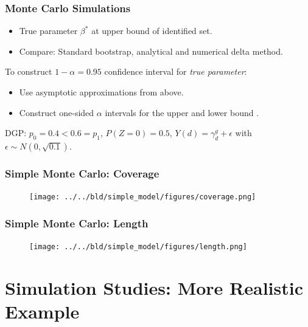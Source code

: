 \documentclass[11pt, aspectratio=169]{beamer}
\begin{document}
\begin{frame}
    \frametitle{Monte Carlo Simulations}

    \begin{itemize}
        \item True parameter $\beta^*$ at upper bound of identified set.
        \item Compare: Standard bootstrap, analytical and numerical delta method.
    \end{itemize}

    \vspace{0.5cm}

    To construct $1-\alpha = 0.95$ confidence interval for \textit{true parameter}:
    \begin{itemize}
        \item Use asymptotic approximations from above.
        \item Construct one-sided $\alpha$ intervals for the upper and lower bound \citep{imbens2004confidence}.
    \end{itemize}

    \vspace{0.5cm}

    DGP\@: $p_0 = 0.4 < 0.6 = p_1$, $P(Z=0)=0.5$, $Y(d) = \gamma_d^g + \epsilon$ with $\epsilon\sim N(0, \sqrt{0.1})$.


\end{frame}

\begin{frame}
    \frametitle{Simple Monte Carlo: Coverage}

    \begin{figure}
        \texttt{[image: ../../bld/simple\_model/figures/coverage.png]}
    \end{figure}

\end{frame}

\begin{frame}
    \frametitle{Simple Monte Carlo: Length}

    \begin{figure}
        \texttt{[image: ../../bld/simple\_model/figures/length.png]}
    \end{figure}

\end{frame}

\section{Simulation Studies: More Realistic Example}
\end{document}
